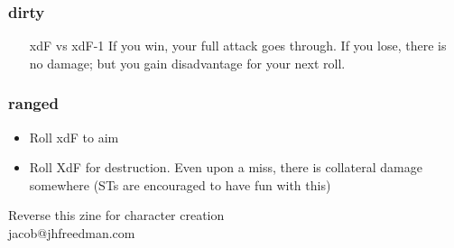 \documentclass[statementpaper,oneside,article,12pt]{memoir}
\begin{document}
	\subsubsection{dirty}
	\begin{itemize}
		\item[xdF vs xdF-1] If you win, your full attack goes through. If you lose, there is no damage; but you gain disadvantage for your next roll.
	\end{itemize}
	\subsubsection{ranged}
	\begin{itemize}
		\item  Roll xdF to aim
		\item  Roll XdF for destruction. Even upon a miss, there is collateral damage somewhere (STs are encouraged to have fun with this)
	\end{itemize}

	
	
	
	\newpage
	
	\vspace*{\fill}
	
	Reverse this zine for character creation
	\\jacob@jhfreedman.com
	
\end{document}
